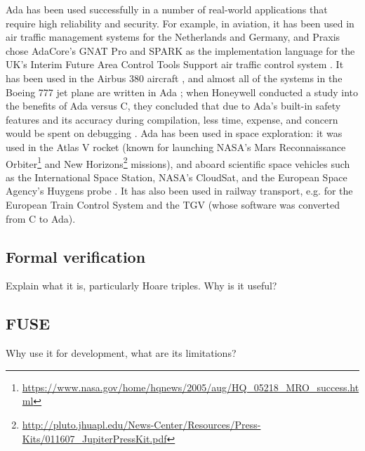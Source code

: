 Ada has been used successfully in a number of real-world applications that require high reliability and security.
For example, in aviation, it has been used in air traffic management systems for the Netherlands and Germany, and Praxis chose AdaCore's GNAT Pro and SPARK as the implementation language for the UK's Interim Future Area Control Tools Support air traffic control system \cite{adacore2007}.
It has been used in the Airbus 380 aircraft \cite{feldman2014}, and almost all of the systems in the Boeing 777 jet plane are written in Ada \cite{adaicBoeing}; when Honeywell conducted a study into the benefits of Ada versus C, they concluded that due to Ada's built-in safety features and its accuracy during compilation, less time, expense, and concern would be spent on debugging \cite{adaicBoeing}.
Ada has been used in space exploration: it was used in the Atlas V rocket (known for launching NASA's Mars Reconnaissance Orbiter\footnote{\url{https://www.nasa.gov/home/hqnews/2005/aug/HQ_05218_MRO_success.html}} and New Horizons\footnote{\url{http://pluto.jhuapl.edu/News-Center/Resources/Press-Kits/011607_JupiterPressKit.pdf}} missions), and aboard scientific space vehicles such as the International Space Station, NASA's CloudSat, and the European Space Agency's Huygens probe \cite{feldman2014}.
It has also been used in railway transport, e.g. for the European Train Control System and the TGV (whose software was converted from C to Ada).

\subsection{Formal verification}
Explain what it is, particularly Hoare triples.
Why is it useful?

\subsection{FUSE}
Why use it for development, what are its limitations?
